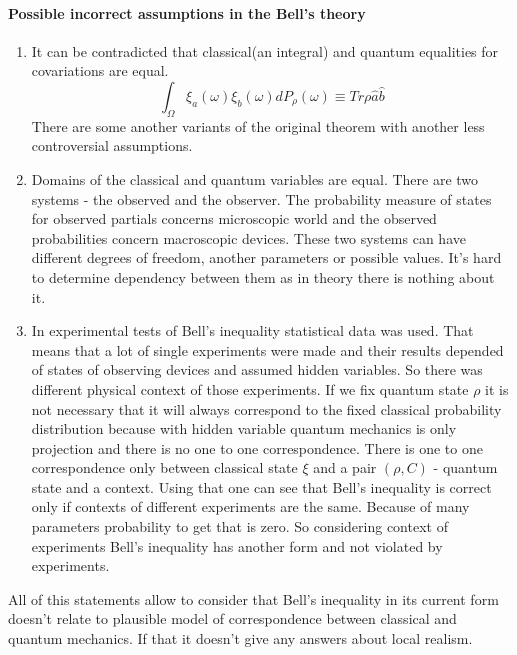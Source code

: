 \documentclass[12pt]{article}
\begin{document}
\paragraph{Possible incorrect assumptions in the Bell's theory}
\begin{enumerate}
\item It can be contradicted that classical(an integral) and quantum equalities for covariations are equal.
$$\int_\Omega\xi_a(\omega)\xi_b(\omega)dP_\rho(\omega) \equiv Tr\rho\hat{a}\hat{b}$$
There are some another variants of the original theorem with another less controversial assumptions.
\item Domains of the classical and quantum variables are equal. There are two systems - the observed and the observer. The probability measure of states for observed partials concerns microscopic world and the observed probabilities concern macroscopic devices. These two systems can have different degrees of freedom, another parameters or possible values. It's hard to determine dependency between them as in theory there is nothing about it.
\item In experimental tests of Bell's inequality statistical data was used. That means that a lot of single experiments were made and their results depended of states of observing devices and assumed hidden variables. So there was different physical context of those experiments. If we fix quantum state $\rho$ it is not necessary that it will always correspond to the fixed classical probability distribution because with hidden variable quantum mechanics is only projection and there is no one to one correspondence. There is one to one correspondence only between classical state $\xi$ and a pair $(\rho, C)$ - quantum state and a context. Using that one can see that Bell's inequality is correct only if contexts of different experiments are the same. Because of many parameters probability to get that is zero. So considering context of experiments Bell's inequality has another form and not violated by experiments.
\end{enumerate}

All of this statements allow to consider that Bell's inequality in its current form doesn't relate to plausible model of correspondence between classical and quantum mechanics. If that it doesn't give any answers about local realism.
\end{document}
